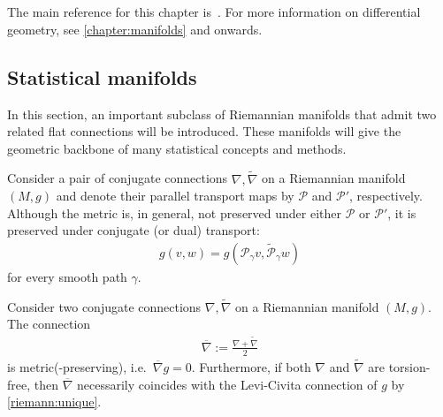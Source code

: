 \chapter{}\label{chapter:info}

    The main reference for this chapter is~\citet{amari_information_2016}. For more information on differential geometry, see \cref{chapter:manifolds} and onwards.

\section{Statistical manifolds}

    In this section, an important subclass of Riemannian manifolds that admit two related flat connections will be introduced. These manifolds will give the geometric backbone of many statistical concepts and methods.

    \begin{property}
        Consider a pair of conjugate connections $\nabla,\widetilde{\nabla}$ on a Riemannian manifold $(M,g)$ and denote their parallel transport maps by $\mathcal{P}$ and $\mathcal{P}'$, respectively. Although the metric is, in general, not preserved under either $\mathcal{P}$ or $\mathcal{P}'$, it is preserved under conjugate (or dual) transport:
        \begin{gather}
            g(v,w) = g\left(\mathcal{P}_\gamma v,\widetilde{\mathcal{P}}_\gamma w\right)
        \end{gather}
        for every smooth path $\gamma$.
    \end{property}

    \begin{property}
        Consider two conjugate connections $\nabla,\widetilde{\nabla}$ on a Riemannian manifold $(M,g)$. The connection
        \begin{gather}
            \overline{\nabla} := \frac{\nabla+\widetilde{\nabla}}{2}
        \end{gather}
        is metric(-preserving), i.e.~$\overline{\nabla}g=0$. Furthermore, if both $\nabla$ and $\widetilde{\nabla}$ are torsion-free, then $\overline{\nabla}$ necessarily coincides with the Levi-Civita connection of $g$ by \cref{riemann:unique}.
    \end{property}

